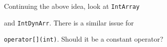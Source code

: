 Continuing the above idea, look at \texttt{IntArray}

and \texttt{IntDynArr}. There is a similar issue for

\texttt{operator[](int)}. Should it be a constant operator?

